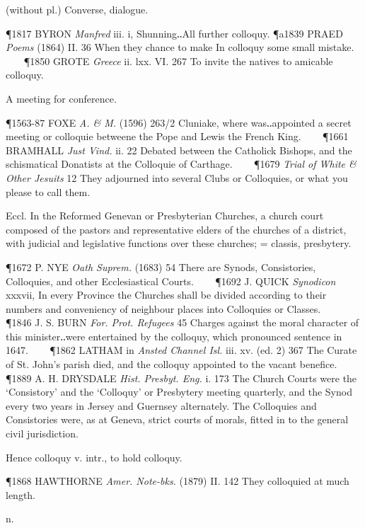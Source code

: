 \begin{description}[wide, labelwidth=!, labelindent=0pt]
\begin{myenumerate}
 (without pl.) Converse, dialogue.

\P 1817 BYRON  \textit{Manfred} iii. i, Shunning‥All further colloquy.
\P a1839 PRAED  \textit{Poems} (1864) II. 36 When they chance to make In colloquy some small mistake.    
\P 1850 GROTE  \textit{Greece} ii. lxx. VI. 267 To invite the natives to amicable colloquy.

 A meeting for conference.

\P 1563-87 FOXE  \textit{A. \& M.} (1596) 263/2 Cluniake, where was‥appointed a secret meeting or colloquie betweene the Pope and Lewis the French King.    
\P 1661 BRAMHALL  \textit{Just Vind.} ii. 22 Debated between the Catholick Bishops, and the schismatical Donatists at the Colloquie of Carthage.    
\P 1679  \textit{Trial of White \& Other Jesuits} 12 They adjourned into several Clubs or Colloquies, or what you please to call them.

 Eccl. In the Reformed Genevan or Presbyterian Churches, a church court composed of the pastors and representative elders of the churches of a district, with judicial and legislative functions over these churches; = classis, presbytery.

\P 1672 P. NYE  \textit{Oath Suprem.} (1683) 54 There are Synods, Consistories, Colloquies, and other Ecclesiastical Courts.    
\P 1692 J. QUICK  \textit{Synodicon} xxxvii, In every Province the Churches shall be divided according to their numbers and conveniency of neighbour places into Colloquies or Classes.    
\P 1846 J. S. BURN  \textit{For. Prot. Refugees} 45 Charges against the moral character of this minister‥were entertained by the colloquy, which pronounced sentence in 1647.    
\P 1862 LATHAM in  \textit{Ansted Channel Isl.} iii. xv. (ed. 2) 367 The Curate of St. John's parish died, and the colloquy appointed to the vacant benefice.    
\P 1889 A. H. DRYSDALE  \textit{Hist. Presbyt. Eng.} i. 173 The Church Courts were the ‘Consistory’ and the ‘Colloquy’ or Presbytery meeting quarterly, and the Synod every two years in Jersey and Guernsey alternately. The Colloquies and Consistories were, as at Geneva, strict courts of morals, fitted in to the general civil jurisdiction.

\noindent
Hence colloquy v. intr., to hold colloquy.

\P 1868 HAWTHORNE  \textit{Amer. Note-bks.} (1879) II. 142 They colloquied at much length.
\end{myenumerate}


 n.


\end{description}
